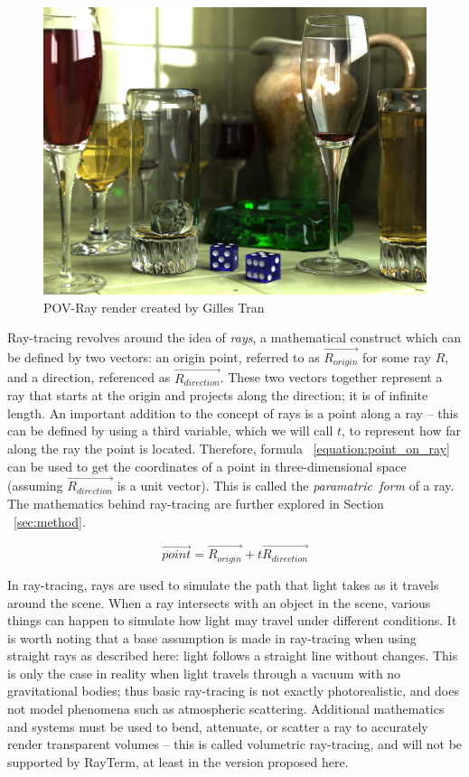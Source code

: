 \documentclass[11pt]{article}
\newcommand{\name}{{\sc RayTerm}}
\newcommand{\rayorg}{\vec{R_{origin}}}
\newcommand{\raydir}{\vec{R_{direction}}}
\begin{document}
\begin{figure}[htb]
  \centering
  \includegraphics[width=\textwidth]{resources/glasses_povray}
  \caption{POV-Ray render created by Gilles Tran}
  \label{fig:povray_render}
\end{figure}


Ray-tracing revolves around the idea of {\it rays}, a mathematical construct which can be defined by two vectors: an origin point, referred to as $\rayorg$ for some ray $R$, and a direction, referenced as $\raydir$.
These two vectors together represent a ray that starts at the origin and projects along the direction; it is of infinite length. An important addition to the concept of rays is a point along a ray -- this can be defined by using a third variable, which we will call $t$, to represent how far along the ray the point is located.
Therefore, formula ~\ref{equation:point_on_ray} can be used to get the coordinates of a point in three-dimensional space (assuming $\raydir$ is a unit vector). This is called the {\it paramatric~form} of a ray. The mathematics behind ray-tracing are further explored in Section ~\ref{sec:method}.

\begin{equation}
  \label{equation:point_on_ray}
  \vec{point} = \rayorg + t\raydir
\end{equation}

In ray-tracing, rays are used to simulate the path that light takes as it travels around the scene.
When a ray intersects with an object in the scene, various things can happen to simulate how light may travel under different conditions.
It is worth noting that a base assumption is made in ray-tracing when using straight rays as described here: light follows a straight line without changes.
This is only the case in reality when light travels through a vacuum with no gravitational bodies; thus basic ray-tracing is not exactly photorealistic, and does not model phenomena such as atmospheric scattering.
Additional mathematics and systems must be used to bend, attenuate, or scatter a ray to accurately render transparent volumes -- this is called volumetric ray-tracing, and will not be supported by \name, at least in the version proposed here.
\end{document}
